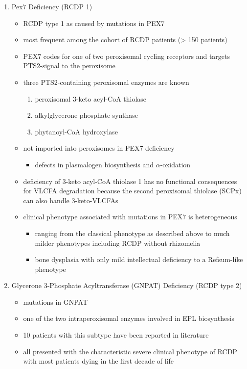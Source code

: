 \documentclass{scrartcl}
\begin{document}
\begin{enumerate}
\item Pex7 Deficiency (RCDP 1)
\label{sec:org0e02c34}

\begin{itemize}
\item RCDP type 1 as caused by mutations in PEX7
\item most frequent among the cohort of RCDP patients (> 150 patients)
\item PEX7 codes for one of two peroxisomal cycling receptors and targets PTS2-signal to the peroxisome
\item three PTS2-containing peroxisomal enzymes are known 
\begin{enumerate}
\item peroxisomal 3-keto acyl-CoA thiolase
\item alkylglycerone phosphate synthase
\item phytanoyl-CoA hydroxylase
\end{enumerate}
\item not imported into peroxisomes in PEX7 deficiency
\begin{itemize}
\item defects in plasmalogen biosynthesis and \(\alpha\)-oxidation
\end{itemize}
\item deficiency of 3-keto acyl-CoA thiolase 1 has no functional
consequences for VLCFA degradation because the second peroxisomal
thiolase (SCPx) can also handle 3-keto-VLCFAs

\item clinical phenotype associated with mutations in PEX7 is heterogeneous
\begin{itemize}
\item ranging from the classical phenotype as described above to much milder phenotypes including RCDP without rhizomelia
\item bone dysplasia with only mild intellectual deficiency to a Refsum-like phenotype
\end{itemize}
\end{itemize}

\item Glycerone 3-Phosphate Acyltransferase (GNPAT) Deficiency (RCDP type 2)
\label{sec:org30e4a31}
\begin{itemize}
\item mutations in GNPAT
\item one of the two intraperoxisomal enzymes involved in EPL biosynthesis
\item 10 patients with this subtype have been reported in literature
\item all presented with the characteristic severe clinical phenotype of
RCDP with most patients dying in the first decade of life
\end{itemize}


\end{enumerate}
\end{document}
